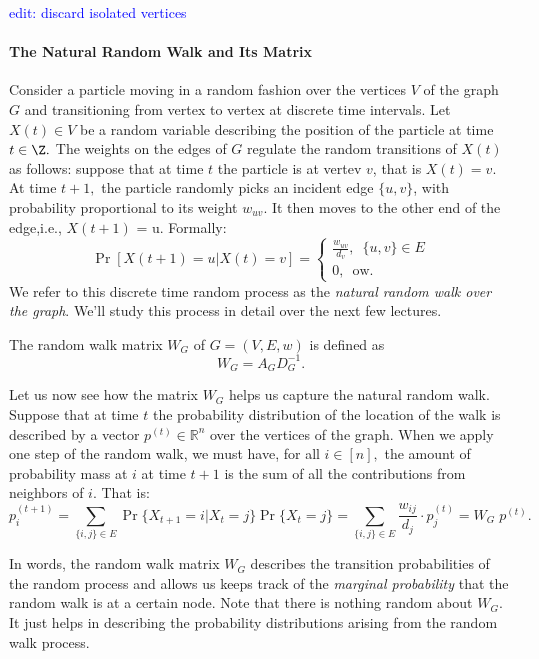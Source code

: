 \textcolor{blue}{edit: discard isolated vertices}

\paragraph{The Natural Random Walk and Its Matrix}

Consider a particle moving in a random fashion over the vertices $V$ of the graph $G$ and transitioning from vertex to vertex at discrete time intervals. Let $X(t) \in V$ be a random variable describing the position of the particle at time $t \in \Z.$ The weights on the edges of $G$ regulate the random transitions of $X(t)$ as follows: suppose that at time $t$ the particle is at vertev $v$, that is $X(t) = v$. At time $t+1,$ the particle randomly picks an incident edge $\{u,v\}$, with probability proportional to its weight $w_{uv}.$ It then moves to the other end of the edge,i.e., $X(t+1)$ = u. Formally:
$$
\Pr[X(t+1) = u | X(t) = v] = \begin{cases}
										\frac{w_{uv}}{d_v}, \enspace \{u,v\} \in E\\
										0, \enspace \textrm{ow}.
										\end{cases}
$$
We refer to this discrete time random process as the {\it natural random walk over the graph}. We'll study this process in detail over the next few lectures.

\begin{definition}
The random walk matrix $W_G$ of $G=(V,E,w)$ is defined as
$$
{W_G} = {A}_G {D}_G^{-1}.
$$
\end{definition}

Let us now see how the matrix ${W}_G$ helps us capture the natural random walk. Suppose that at time $t$ the probability distribution of the location of the walk is described by a vector $p^{(t)} \in \mathbb{R}^n$ over the vertices of the graph. When we apply one step of the random walk, we must have, for all $i \in [n],$ the amount of probability mass at $i$ at time $t+1$ is the sum of all the contributions from neighbors of $i.$ That is:
$$
p^{(t+1)}_i = \sum_{\{i,j\} \in E} \Pr\{X_{t+1} = i | X_{t} = j \} \Pr\{X_{t} = j\} = \sum_{\{i,j\} \in E}
\frac{w_{ij}}{d_j} \cdot p^{(t)}_j = {W}_G \; p^{(t)}.
$$

In words, the random walk matrix ${W}_G$ describes the transition probabilities of the random process and allows us keeps track of the {\it marginal probability} that the random walk is at a certain node. Note that there is nothing random about ${W}_G$. It just helps in describing the probability distributions arising from the random walk process.





